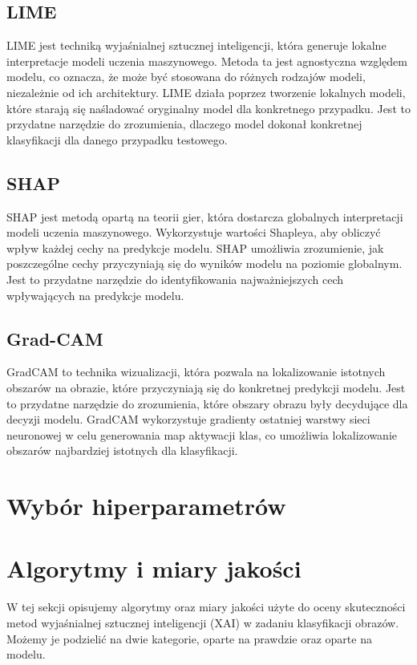 \subsection*{LIME}
LIME jest techniką wyjaśnialnej sztucznej inteligencji, która generuje lokalne interpretacje modeli uczenia maszynowego.
Metoda ta jest agnostyczna względem modelu, co oznacza, że może być stosowana do różnych rodzajów modeli, niezależnie od ich architektury.
LIME działa poprzez tworzenie lokalnych modeli, które starają się naśladować oryginalny model dla konkretnego przypadku.
Jest to przydatne narzędzie do zrozumienia, dlaczego model dokonał konkretnej klasyfikacji dla danego przypadku testowego.

\subsection*{SHAP}
SHAP jest metodą opartą na teorii gier, która dostarcza globalnych interpretacji modeli uczenia maszynowego.
Wykorzystuje wartości Shapleya, aby obliczyć wpływ każdej cechy na predykcje modelu.
SHAP umożliwia zrozumienie, jak poszczególne cechy przyczyniają się do wyników modelu na poziomie globalnym.
Jest to przydatne narzędzie do identyfikowania najważniejszych cech wpływających na predykcje modelu.

\subsection*{Grad-CAM}
GradCAM to technika wizualizacji, która pozwala na lokalizowanie istotnych obszarów na obrazie, które przyczyniają się do konkretnej predykcji modelu.
Jest to przydatne narzędzie do zrozumienia, które obszary obrazu były decydujące dla decyzji modelu.
GradCAM wykorzystuje gradienty ostatniej warstwy sieci neuronowej w celu generowania map aktywacji klas, co umożliwia lokalizowanie obszarów najbardziej istotnych dla klasyfikacji.

\section*{Wybór hiperparametrów}

\section*{Algorytmy i miary jakości}

W tej sekcji opisujemy algorytmy oraz miary jakości użyte do oceny skuteczności metod wyjaśnialnej sztucznej inteligencji (XAI) w zadaniu klasyfikacji obrazów.
Możemy je podzielić na dwie kategorie, oparte na prawdzie oraz oparte na modelu.

